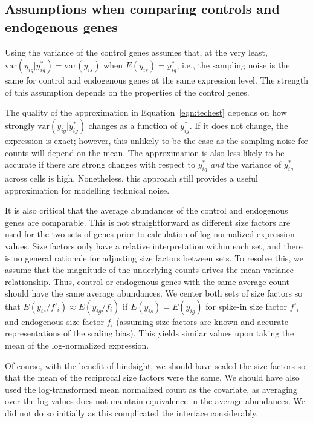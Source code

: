\documentclass{article}
\begin{document}
\subsection{Assumptions when comparing controls and endogenous genes}
Using the variance of the control genes assumes that, at the very least, $\mbox{var}(y_{ig}|y_{ig}^*) = \mbox{var}(y_{is})$ when $E(y_{is}) = y_{ig}^*$, 
i.e., the sampling noise is the same for control and endogenous genes at the same expression level.
The strength of this assumption depends on the properties of the control genes.

The quality of the approximation in Equation~\ref{eqn:techest} depends on how strongly $\mbox{var}(y_{ig}|y_{ig}^*)$ changes as a function of $y^*_{ig}$.
If it does not change, the expression is exact; however, this unlikely to be the case as the sampling noise for counts will depend on the mean.
The approximation is also less likely to be accurate if there are strong changes with respect to $y_{ig}^*$ \textit{and} the variance of $y_{ig}^*$ across cells is high.
Nonetheless, this approach still provides a useful approximation for modelling technical noise.

It is also critical that the average abundances of the control and endogenous genes are comparable.
This is not straightforward as different size factors are used for the two sets of genes prior to calculation of log-normalized expression values.
Size factors only have a relative interpretation within each set, and there is no general rationale for adjusting size factors between sets.
To resolve this, we assume that the magnitude of the underlying counts drives the mean-variance relationship.
Thus, control or endogenous genes with the same average count should have the same average abundances.
We center both sets of size factors so that $E(y_{is}/f'_i) \approx E(y_{ig}/f_i)$ if $E(y_{is})=E(y_{ig})$ for spike-in size factor $f'_i$ and endogenous size factor $f_i$ (assuming size factors are known and accurate representations of the scaling bias).
This yields similar values upon taking the mean of the log-normalized expression.

Of course, with the benefit of hindsight, we should have scaled the size factors so that the mean of the reciprocal size factors were the same.
We should have also used the log-transformed mean normalized count as the covariate, as averaging over the log-values does not maintain equivalence in the average abundances.
We did not do so initially as this complicated the interface considerably.
\end{document}
